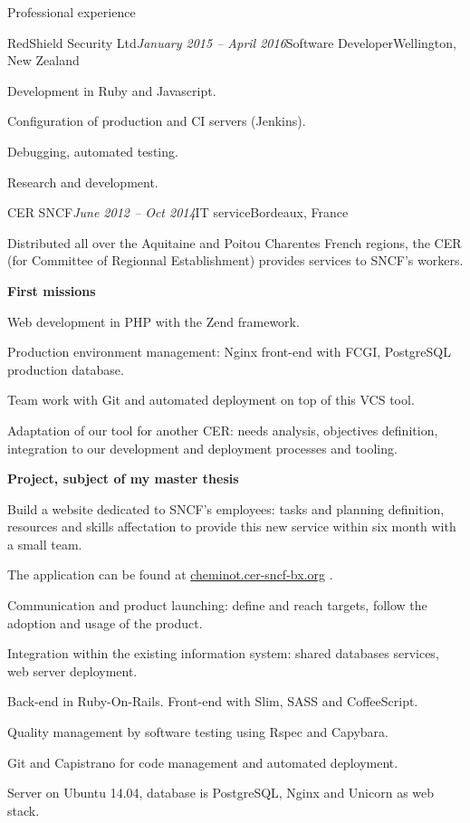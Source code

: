 \begin{rSection}{Professional experience}

  \begin{rSubsection}{RedShield Security Ltd}{\em January 2015 -- April 2016}{Software Developer}{Wellington, New Zealand}
    \item[] Development in Ruby and Javascript.
    \item[] Configuration of production and CI servers (Jenkins).
    \item[] Debugging, automated testing.
    \item[] Research and development.
  \end{rSubsection}



  \begin{rSubsection}{CER SNCF}{\em June 2012 -- Oct 2014}{IT service}{Bordeaux, France}
    \item[] Distributed all over the Aquitaine and Poitou Charentes French regions, the CER (for Committee of Regionnal Establishment) provides services to SNCF's workers.

    \textbf{First missions}
      \item Web development in PHP with the Zend framework.
      \item Production environment management: Nginx front-end with FCGI, PostgreSQL production database.
      \item Team work with Git and automated deployment on top of this VCS tool.
      \item Adaptation of our tool for another CER: needs analysis, objectives definition, integration to our development and deployment processes and tooling.

    \textbf{Project, subject of my master thesis}
      \item Build a website dedicated to SNCF's employees: tasks and planning definition, resources and skills affectation to provide this new service within six month with a small team.
      \item The application can be found at \href{http://cheminot.cer-sncf-bx.org}{cheminot.cer-sncf-bx.org} .
      \item Communication and product launching: define and reach targets, follow the adoption and usage of the product.
      \item Integration within the existing information system: shared databases services, web server deployment.
      \item Back-end in Ruby-On-Rails. Front-end with Slim, SASS and CoffeeScript.
      \item Quality management by software testing using Rspec and Capybara.
      \item Git and Capistrano for code management and automated deployment.
      \item Server on Ubuntu 14.04, database is PostgreSQL, Nginx and Unicorn as web stack.


\end{rSubsection}
\end{rSection}
